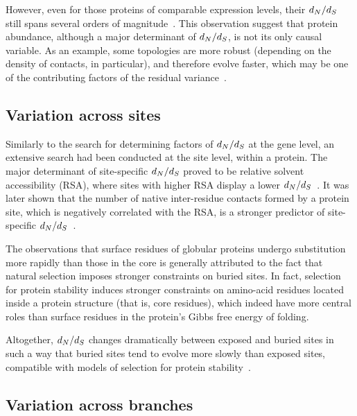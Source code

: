 However, even for those proteins of comparable expression levels, their $d_N / d_S$ still spans several orders of magnitude~\citep{Drummond2008}.
This observation suggest that protein abundance, although a major determinant of $d_N / d_S$, is not its only causal variable.
As an example, some topologies are more robust (depending on the density of contacts, in particular), and therefore evolve faster, which may be one of the contributing factors of the residual variance~\citep{Echave2017}.

\subsection{Variation across sites}
\label{subsec:thermo-variation-across-sites}

Similarly to the search for determining factors of $d_N / d_S$ at the gene level, an extensive search had been conducted at the site level, within a protein.
The major determinant of site-specific $d_N / d_S$ proved to be relative solvent accessibility (RSA), where sites with higher RSA display a lower $d_N / d_S$~\citep{Ramsey2011}.
It was later shown that the number of native inter-residue contacts formed by a protein site, which is negatively correlated with the RSA, is a stronger predictor of site-specific $d_N / d_S$~\citep{Yeh2013}.

The observations that surface residues of globular proteins undergo substitution more rapidly than those in the core is generally attributed to the fact that natural selection imposes stronger constraints on buried sites.
In fact, selection for protein stability induces stronger constraints on amino-acid residues located inside a protein structure (that is, core residues), which indeed have more central roles than surface residues in the protein's Gibbs free energy of folding.

Altogether, $d_N / d_S$ changes dramatically between exposed and buried sites in such a way that buried sites tend to evolve more slowly than exposed sites, compatible with models of selection for protein stability~\citep{Echave2016}.

\subsection{Variation across branches}
\label{subsec:thermo-variation-across-branches}

